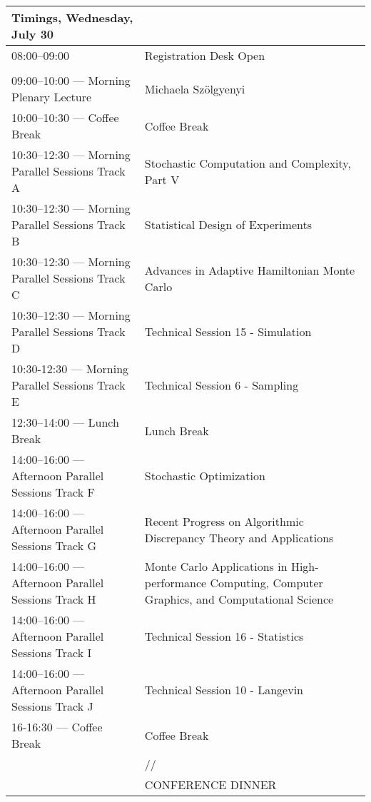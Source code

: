 \begin{sideways}
\begin{tabular}{l|l}
\hline
\large\textbf{Timings, Wednesday,
 July 30} & \large\textbf{} \\
\hline
\cellcolor{\EmptyColor}08:00–09:00 & \cellcolor{\EmptyColor}Registration Desk Open \\
\cellcolor{\SessionTitleColor} & \cellcolor{\SessionTitleColor} \\
\cellcolor{\PlenaryColor}09:00–10:00 — Morning Plenary Lecture & \cellcolor{\PlenaryColor}Michaela Szölgyenyi \\
\cellcolor{\EmptyColor}10:00–10:30 — Coffee Break & \cellcolor{\EmptyColor}Coffee Break \\
\cellcolor{\SessionTitleColor}10:30–12:30 — Morning Parallel Sessions Track A & \cellcolor{\SessionTitleColor}Stochastic Computation and Complexity, Part V \\
\cellcolor{\SessionTitleColor}10:30–12:30 — Morning Parallel Sessions Track B & \cellcolor{\SessionTitleColor}Statistical Design of Experiments \\
\cellcolor{\SessionTitleColor}10:30–12:30 — Morning Parallel Sessions Track C & \cellcolor{\SessionTitleColor}Advances in Adaptive Hamiltonian Monte Carlo \\
\cellcolor{\SessionLightColor}10:30–12:30 — Morning Parallel Sessions Track D & \cellcolor{\SessionLightColor}Technical Session 15 - Simulation \\
\cellcolor{\SessionLightColor}10:30-12:30 — Morning Parallel Sessions Track E & \cellcolor{\SessionLightColor}Technical Session 6 - Sampling \\
\cellcolor{\EmptyColor}12:30–14:00 — Lunch Break & \cellcolor{\EmptyColor}Lunch Break \\
\cellcolor{\SessionTitleColor}14:00–16:00 — Afternoon Parallel Sessions Track F & \cellcolor{\SessionTitleColor}Stochastic Optimization \\
\cellcolor{\SessionTitleColor}14:00–16:00 — Afternoon Parallel Sessions Track G & \cellcolor{\SessionTitleColor}Recent Progress on Algorithmic Discrepancy Theory and Applications \\
\cellcolor{\SessionTitleColor}14:00–16:00  — Afternoon Parallel Sessions Track H & \cellcolor{\SessionTitleColor}Monte Carlo Applications in High-performance Computing, Computer Graphics, and Computational Science \\
\cellcolor{\SessionLightColor}14:00–16:00  — Afternoon Parallel Sessions Track I & \cellcolor{\SessionLightColor}Technical Session 16 - Statistics \\
\cellcolor{\SessionLightColor}14:00–16:00  — Afternoon Parallel Sessions Track J & \cellcolor{\SessionLightColor}Technical Session 10 - Langevin \\
\cellcolor{\EmptyColor}16-16:30 — Coffee Break & \cellcolor{\EmptyColor}Coffee Break \\
\cellcolor{\SessionTitleColor} & \cellcolor{\SessionTitleColor}// \\
\cellcolor{\SessionTitleColor} & \cellcolor{\SessionTitleColor}CONFERENCE DINNER \\
\hline
\end{tabular}
\end{sideways}

